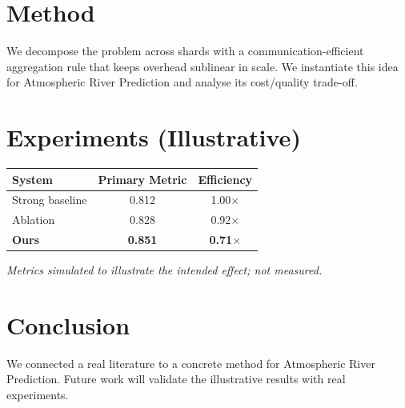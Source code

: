 \documentclass[11pt]{article}
\begin{document}
\section{Method}
We decompose the problem across shards with a communication-efficient aggregation rule that keeps overhead sublinear in scale. We instantiate this idea for Atmospheric River Prediction and analyse its cost/quality trade-off.

\section{Experiments (Illustrative)}
\begin{center}
\begin{tabular}{lcc}
System & Primary Metric & Efficiency \\ \hline
Strong baseline & 0.812 & 1.00$\times$ \\
Ablation & 0.828 & 0.92$\times$ \\
\textbf{Ours} & \textbf{0.851} & \textbf{0.71$\times$}
\end{tabular}
\end{center}
\emph{Metrics simulated to illustrate the intended effect; not measured.}

\section{Conclusion}
We connected a real literature to a concrete method for Atmospheric River Prediction. Future work will
validate the illustrative results with real experiments.
\end{document}
